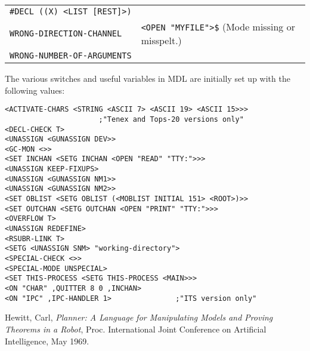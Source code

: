 \documentclass[a4paper]{scrbook}
\begin{document}
\begin{longtable}[]{@{}ll@{}}
\begin{minipage}[t]{0.36\columnwidth}
\texttt{\#DECL\ ((X)\ \textless{}LIST\ {[}REST{]}\textgreater{})}\strut
\end{minipage}\tabularnewline
\begin{minipage}[t]{0.58\columnwidth}\raggedright\strut
\texttt{WRONG-DIRECTION-CHANNEL}\strut
\end{minipage} & \begin{minipage}[t]{0.36\columnwidth}\raggedright\strut
\texttt{\textless{}OPEN\ "MYFILE"\textgreater{}\$} (Mode missing or misspelt.)\strut
\end{minipage}\tabularnewline
\begin{minipage}[t]{0.58\columnwidth}\raggedright\strut
\texttt{WRONG-NUMBER-OF-ARGUMENTS}\strut
\end{minipage} & \begin{minipage}[t]{0.36\columnwidth}\raggedright\strut
\strut
\end{minipage}\tabularnewline
\bottomrule
\end{longtable}

\label{appendix-5.-initial-settings}

The various switches and useful variables in MDL are initially set up with the following values: 
    
 

\begin{verbatim}
<ACTIVATE-CHARS <STRING <ASCII 7> <ASCII 19> <ASCII 15>>>
                      ;"Tenex and Tops-20 versions only"
<DECL-CHECK T>
<UNASSIGN <GUNASSIGN DEV>>
<GC-MON <>>
<SET INCHAN <SETG INCHAN <OPEN "READ" "TTY:">>>
<UNASSIGN KEEP-FIXUPS>
<UNASSIGN <GUNASSIGN NM1>>
<UNASSIGN <GUNASSIGN NM2>>
<SET OBLIST <SETG OBLIST (<MOBLIST INITIAL 151> <ROOT>)>>
<SET OUTCHAN <SETG OUTCHAN <OPEN "PRINT" "TTY:">>>
<OVERFLOW T>
<UNASSIGN REDEFINE>
<RSUBR-LINK T>
<SETG <UNASSIGN SNM> "working-directory">
<SPECIAL-CHECK <>>
<SPECIAL-MODE UNSPECIAL>
<SET THIS-PROCESS <SETG THIS-PROCESS <MAIN>>>
<ON "CHAR" ,QUITTER 8 0 ,INCHAN>
<ON "IPC" ,IPC-HANDLER 1>               ;"ITS version only"
\end{verbatim}

\label{references}

Hewitt, Carl, \emph{Planner: A Language for Manipulating Models and Proving Theorems in a Robot}, Proc. International Joint
Conference on Artificial Intelligence, May 1969.
\end{document}
